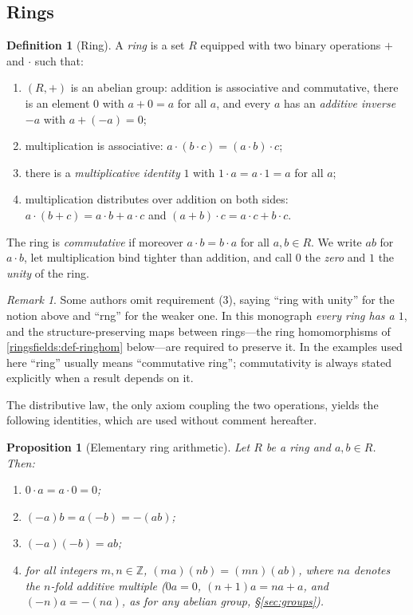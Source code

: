 \documentclass[11pt,a4paper]{article}
\newtheorem{proposition}[theorem]{Proposition}
\theoremstyle{definition}
\newtheorem{definition}[theorem]{Definition}
\theoremstyle{remark}
\newtheorem{remark}[theorem]{Remark}
\newcommand{\Z}{\ensuremath{\mathbb{Z}}}
\begin{document}
\subsection{Rings}\label{ringsfields:subsec-rings}

\begin{definition}[Ring]\label{ringsfields:def-ring}
A \emph{ring} is a set \(R\) equipped with two binary operations \(+\) and
\(\cdot\) such that:
\begin{enumerate}
\item \((R,+)\) is an abelian group: addition is associative and
  commutative, there is an element \(0\) with \(a+0=a\) for all \(a\), and
  every \(a\) has an \emph{additive inverse} \(-a\) with \(a+(-a)=0\);
\item multiplication is associative: \(a\cdot(b\cdot c)=(a\cdot b)\cdot c\);
\item there is a \emph{multiplicative identity} \(1\) with
  \(1\cdot a=a\cdot 1=a\) for all \(a\);
\item multiplication distributes over addition on both sides:
  \(a\cdot(b+c)=a\cdot b+a\cdot c\) and \((a+b)\cdot c=a\cdot c+b\cdot c\).
\end{enumerate}
The ring is \emph{commutative} if moreover \(a\cdot b=b\cdot a\) for all
\(a,b\in R\). We write \(ab\) for \(a\cdot b\), let multiplication bind
tighter than addition, and call \(0\) the \emph{zero} and \(1\) the
\emph{unity} of the ring.
\end{definition}

\begin{remark}\label{ringsfields:rem-conventions}
Some authors omit requirement (3),
saying ``ring with unity'' for the notion above and ``rng'' for the weaker
one. In this monograph \emph{every ring has a \(1\)}, and the
structure-preserving maps between rings---the ring homomorphisms of
\cref{ringsfields:def-ringhom} below---are required to preserve it.
In the examples used here ``ring'' usually means ``commutative ring'';
commutativity is always stated explicitly when a result depends on it.
\end{remark}

The distributive law, the only axiom coupling the two operations, yields the
following identities, which are used without comment hereafter.

\begin{proposition}[Elementary ring arithmetic]\label{ringsfields:prop-arith}
Let \(R\) be a ring and \(a,b\in R\). Then:
\begin{enumerate}
\item \(0\cdot a=a\cdot 0=0\);
\item \((-a)b=a(-b)=-(ab)\);
\item \((-a)(-b)=ab\);
\item for all integers \(m,n\in\Z\), \((ma)(nb)=(mn)(ab)\), where \(na\)
  denotes the \(n\)-fold additive multiple (\(0a=0\), \((n+1)a=na+a\), and
  \((-n)a=-(na)\), as for any abelian group, \S\ref{sec:groups}).
\end{enumerate}
\end{proposition}
\end{document}
